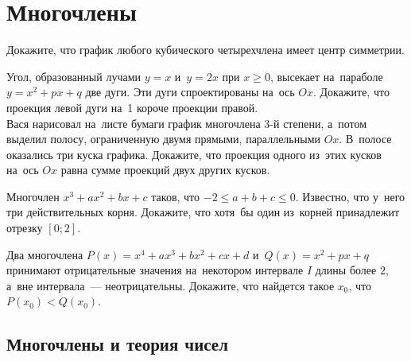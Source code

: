
\section*{Многочлены}


\begingroup \def\piconst{\mathrm{\pi}}

\begin{problems}

\item
Докажите, что график любого кубического четырехчлена имеет центр симметрии.

\item
\subproblem
Угол, образованный лучами $y = x$ и~$y = 2 x$ при $x \geq 0$, высекает
на~параболе $y = x^2 + p x + q$ две дуги.
Эти дуги спроектированы на~ось $Ox$.
Докажите, что проекция левой дуги на~1 короче проекции правой.
\\
\subproblem
Вася нарисовал на~листе бумаги график многочлена $3$-й степени, а~потом выделил
полосу, ограниченную двумя прямыми, параллельными $Ox$.
В~полосе оказались три куска графика.
Докажите, что проекция одного из~этих кусков на~ось $Ox$ равна сумме проекций
двух других кусков.

\item
Многочлен $x^3 + a x^2 + b x + c$ таков, что $-2 \leq a + b + c \leq 0$.
Известно, что у~него три действительных корня.
Докажите, что хотя~бы один из~корней принадлежит отрезку $[0; 2]$.

\item
Два многочлена $P(x) = x^4 + a x^3 + b x^2 + c x + d$ и~$Q(x) = x^2 + p x + q$
принимают отрицательные значения на~некотором интервале $I$ длины более $2$,
а~вне интервала~--- неотрицательны.
Докажите, что найдется такое $x_0$, что $P(x_0) < Q(x_0)$.

\end{problems}

\subsection*{Многочлены и теория чисел}

